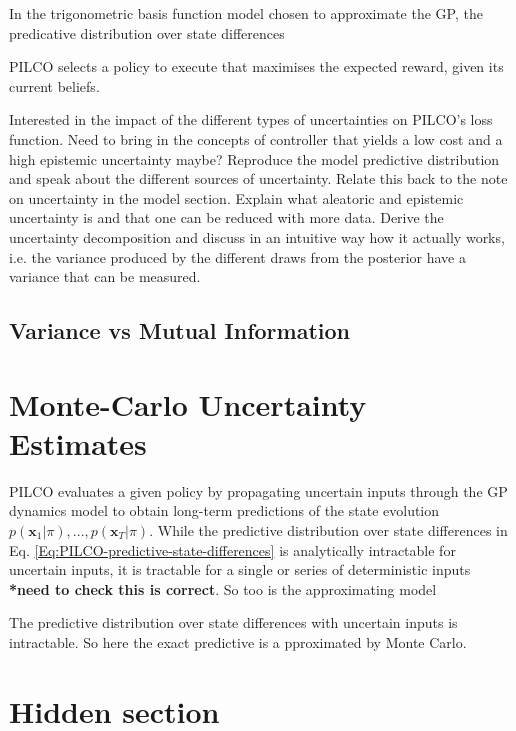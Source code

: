 In the trigonometric basis function model chosen to approximate the GP, the predicative distribution over state differences 

PILCO selects a policy to execute that maximises the expected reward, given its current beliefs. 

Interested in the impact of the different types of uncertainties on PILCO's loss function. Need to bring in the concepts of controller that yields a low cost and a high epistemic uncertainty maybe?
Reproduce the model predictive distribution and speak about the different sources of uncertainty. Relate this back to the note on uncertainty in the model section.
Explain what aleatoric and epistemic uncertainty is and that one can be reduced with more data.
Derive the uncertainty decomposition and discuss in an intuitive way how it actually works, i.e. the variance produced by the different draws from the posterior have a variance that can be measured.
\subsection{Variance vs Mutual Information}
\section{Monte-Carlo Uncertainty Estimates}

PILCO evaluates a given policy by propagating uncertain inputs through the GP dynamics model to obtain long-term predictions of the state evolution $p(\mathbf{x}_{1}|\pi),...,p(\mathbf{x}_{T}|\pi)$. While the predictive distribution over state differences in Eq. \ref{Eq:PILCO-predictive-state-differences} is analytically intractable for uncertain inputs, it is tractable for a single or series of deterministic inputs \textbf{*need to check this is correct}. So too is the approximating model 

The predictive distribution over state differences with uncertain inputs is intractable. So here the exact predictive is a pproximated by Monte Carlo.



\clearpage

\tochide\section{Hidden section}



